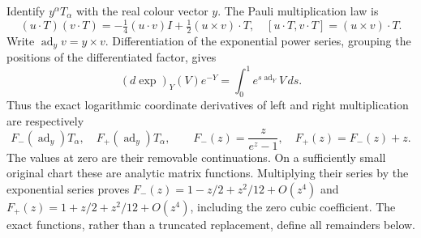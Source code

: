 \documentclass[11pt]{article}
\begin{document}
Identify $y^\alpha T_\alpha$ with the real colour vector $y$.
The Pauli multiplication law is
\begin{equation}\label{eq:vertex-pauli}
 (u\cdot T)(v\cdot T)
       =-\tfrac14(u\cdot v)I+\tfrac12(u\times v)\cdot T,
 \quad [u\cdot T,v\cdot T]=(u\times v)\cdot T.
\end{equation}
Write $\operatorname{ad}_y v=y\times v$. Differentiation of the
exponential power series, grouping the positions of the differentiated
factor, gives
\[
 (d\exp)_Y(V)e^{-Y}=\int_0^1 e^{s\operatorname{ad}_Y}V\,ds.
\]
Thus the exact logarithmic coordinate derivatives of left and right
multiplication are respectively
\[
 F_-(\operatorname{ad}_y)T_\alpha,
 \quad F_+(\operatorname{ad}_y)T_\alpha,
 \qquad F_-(z)=\frac{z}{e^z-1},\quad F_+(z)=F_-(z)+z.
\]
The values at zero are their removable continuations. On a sufficiently
small original chart these are analytic matrix functions. Multiplying
their series by the exponential series proves
$F_-(z)=1-z/2+z^2/12+O(z^4)$ and
$F_+(z)=1+z/2+z^2/12+O(z^4)$, including the zero cubic coefficient.
The exact functions, rather than a truncated replacement, define all
remainders below.
\end{document}
